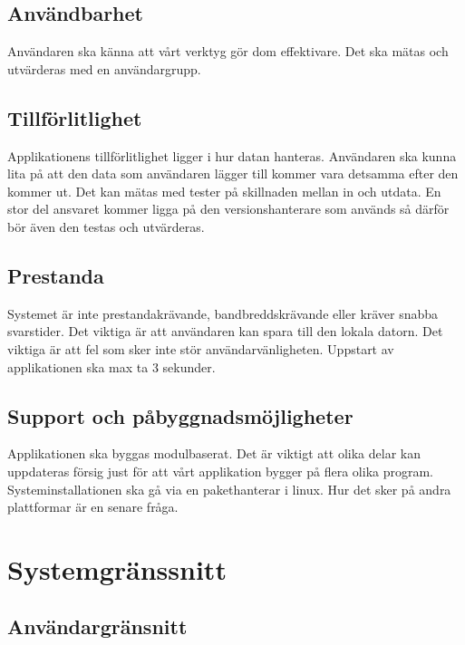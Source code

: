 \subsection{Användbarhet}
Användaren ska känna att vårt verktyg gör dom effektivare. Det ska mätas och utvärderas med en användargrupp. 

\subsection{Tillförlitlighet} 
Applikationens tillförlitlighet ligger i hur datan hanteras. Användaren ska kunna lita på att den data som användaren lägger till kommer vara detsamma efter den kommer ut. Det kan mätas med tester på skillnaden mellan in och utdata. En stor del ansvaret kommer ligga på den versionshanterare som används så därför bör även den testas och utvärderas.

\subsection{Prestanda}
Systemet är inte prestandakrävande, bandbreddskrävande eller kräver snabba svarstider. Det viktiga är att användaren kan spara till den lokala datorn. Det viktiga är att fel som sker inte stör användarvänligheten. Uppstart av applikationen ska max ta 3 sekunder.

\subsection{Support och påbyggnadsmöjligheter} %
Applikationen ska byggas modulbaserat. Det är viktigt att olika delar kan uppdateras försig just för att vårt applikation bygger på flera olika program. Systeminstallationen ska gå via en pakethanterar i linux.  Hur det sker på andra plattformar är en senare fråga.


\section{Systemgränssnitt}

\subsection{Användargränsnitt}

